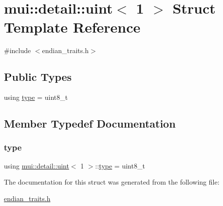 \hypertarget{structmui_1_1detail_1_1uint_3_011_01_4}{}\section{mui\+:\+:detail\+:\+:uint$<$ 1 $>$ Struct Template Reference}
\label{structmui_1_1detail_1_1uint_3_011_01_4}


{\ttfamily \#include $<$endian\+\_\+traits.\+h$>$}

\subsection*{Public Types}
\begin{DoxyCompactItemize}
\item 
using \hyperlink{structmui_1_1detail_1_1uint_3_011_01_4_aa98289e042a564a47df15a4da2267121}{type} = uint8\+\_\+t
\end{DoxyCompactItemize}


\subsection{Member Typedef Documentation}
\mbox{\label{structmui_1_1detail_1_1uint_3_011_01_4_aa98289e042a564a47df15a4da2267121}} 
\subsubsection{\texorpdfstring{type}{type}}
{\footnotesize\ttfamily using \hyperlink{structmui_1_1detail_1_1uint}{mui\+::detail\+::uint}$<$ 1 $>$\+::\hyperlink{structmui_1_1detail_1_1uint_3_011_01_4_aa98289e042a564a47df15a4da2267121}{type} =  uint8\+\_\+t}



The documentation for this struct was generated from the following file\+:\begin{DoxyCompactItemize}
\item 
\hyperlink{endian__traits_8h}{endian\+\_\+traits.\+h}\end{DoxyCompactItemize}
